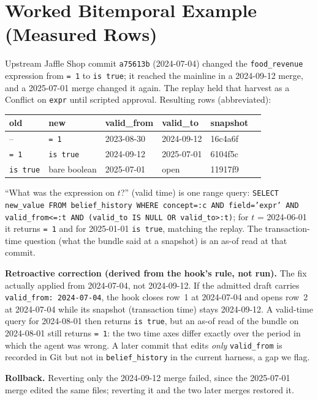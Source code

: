 \documentclass[conference,letterpaper]{IEEEtran}
\begin{document}
\section{Worked Bitemporal Example (Measured Rows)}\label{app:bitemporal}
Upstream Jaffle Shop commit \texttt{a75613b} (2024-07-04) changed the \texttt{food\_revenue} expression from \texttt{= 1} to \texttt{is true}; it reached the mainline in a 2024-09-12 merge, and a 2025-07-01 merge changed it again. The replay held that harvest as a Conflict on \texttt{expr} until scripted approval. Resulting rows (abbreviated):

\begin{center}\scriptsize
\begin{tabular}{@{}llllll@{}}
\toprule
old & new & valid\_from & valid\_to & snapshot\\
\midrule
-- & \texttt{= 1} & 2023-08-30 & 2024-09-12 & 16c4a6f\\
\texttt{= 1} & \texttt{is true} & 2024-09-12 & 2025-07-01 & 6104f5c\\
\texttt{is true} & bare boolean & 2025-07-01 & open & 11917f9\\
\bottomrule
\end{tabular}
\end{center}

\noindent ``What was the expression on $t$?'' (valid time) is one range query:
\texttt{SELECT new\_value FROM belief\_history WHERE concept=:c AND field='expr' AND valid\_from<=:t AND (valid\_to IS NULL OR valid\_to>:t)}; for $t$ = 2024-06-01 it returns \texttt{= 1} and for 2025-01-01 \texttt{is true}, matching the replay. The transaction-time question (what the bundle said at a snapshot) is an as-of read at that commit.

\textbf{Retroactive correction (derived from the hook's rule, not run).} The fix actually applied from 2024-07-04, not 2024-09-12. If the admitted draft carries \texttt{valid\_from: 2024-07-04}, the hook closes row~1 at 2024-07-04 and opens row~2 at 2024-07-04 while its snapshot (transaction time) stays 2024-09-12. A valid-time query for 2024-08-01 then returns \texttt{is true}, but an as-of read of the bundle on 2024-08-01 still returns \texttt{= 1}: the two time axes differ exactly over the period in which the agent was wrong. A later commit that edits \emph{only} \texttt{valid\_from} is recorded in Git but not in \texttt{belief\_history} in the current harness, a gap we flag.

\textbf{Rollback.} Reverting only the 2024-09-12 merge failed, since the 2025-07-01 merge edited the same files; reverting it and the two later merges restored it.
\end{document}
